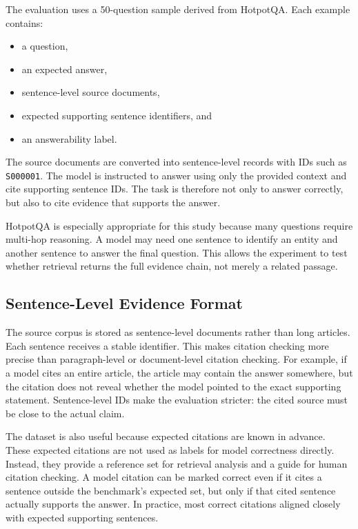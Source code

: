 \documentclass[10pt,twocolumn]{article}
\begin{document}
The evaluation uses a 50-question sample derived from HotpotQA. Each example contains:

\begin{itemize}[leftmargin=*]
    \item a question,
    \item an expected answer,
    \item sentence-level source documents,
    \item expected supporting sentence identifiers, and
    \item an answerability label.
\end{itemize}

The source documents are converted into sentence-level records with IDs such as \texttt{S000001}. The model is instructed to answer using only the provided context and cite supporting sentence IDs. The task is therefore not only to answer correctly, but also to cite evidence that supports the answer.

HotpotQA is especially appropriate for this study because many questions require multi-hop reasoning. A model may need one sentence to identify an entity and another sentence to answer the final question. This allows the experiment to test whether retrieval returns the full evidence chain, not merely a related passage.

\subsection{Sentence-Level Evidence Format}

The source corpus is stored as sentence-level documents rather than long articles. Each sentence receives a stable identifier. This makes citation checking more precise than paragraph-level or document-level citation checking. For example, if a model cites an entire article, the article may contain the answer somewhere, but the citation does not reveal whether the model pointed to the exact supporting statement. Sentence-level IDs make the evaluation stricter: the cited source must be close to the actual claim.

The dataset is also useful because expected citations are known in advance. These expected citations are not used as labels for model correctness directly. Instead, they provide a reference set for retrieval analysis and a guide for human citation checking. A model citation can be marked correct even if it cites a sentence outside the benchmark's expected set, but only if that cited sentence actually supports the answer. In practice, most correct citations aligned closely with expected supporting sentences.
\end{document}
